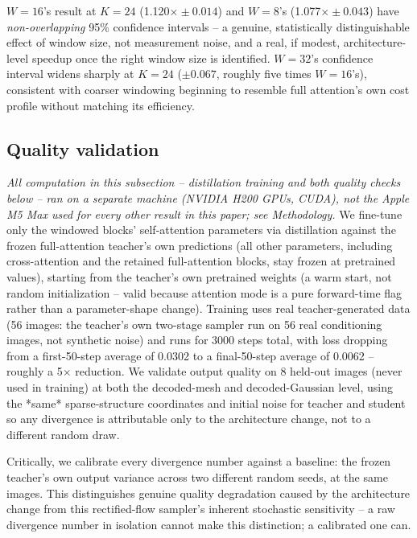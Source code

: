 \documentclass[11pt]{article}
\begin{document}
$W=16$'s result at $K=24$ (1.120$\times \pm 0.014$) and $W=8$'s (1.077$\times \pm 0.043$) have
\emph{non-overlapping} 95\% confidence intervals -- a genuine, statistically distinguishable
effect of window size, not measurement noise, and a real, if modest, architecture-level speedup
once the right window size is identified. $W=32$'s confidence interval widens sharply at $K=24$
($\pm 0.067$, roughly five times $W=16$'s), consistent with coarser windowing beginning to
resemble full attention's own cost profile without matching its efficiency.

\subsection{Quality validation}
\label{sec:quality-validation}
\emph{All computation in this subsection -- distillation training and both quality checks below --
ran on a separate machine (NVIDIA H200 GPUs, CUDA), not the Apple M5 Max used for every other
result in this paper; see Methodology.} We fine-tune only the windowed blocks' self-attention parameters via distillation against the
frozen full-attention teacher's own predictions (all other parameters, including cross-attention
and the retained full-attention blocks, stay frozen at pretrained values), starting from the
teacher's own pretrained weights (a warm start, not random initialization -- valid because
attention mode is a pure forward-time flag rather than a parameter-shape change). Training uses
real teacher-generated data (56 images: the teacher's own two-stage sampler run on 56 real
conditioning images, not synthetic noise) and runs for 3000 steps total, with loss dropping from a
first-50-step average of 0.0302 to a final-50-step average of 0.0062 -- roughly a 5$\times$
reduction. We validate output quality on 8 held-out images (never used in training) at both the
decoded-mesh and decoded-Gaussian level, using the *same* sparse-structure coordinates and initial
noise for teacher and student so any divergence is attributable only to the architecture change,
not to a different random draw.

Critically, we calibrate every divergence number against a baseline: the frozen teacher's own
output variance across two different random seeds, at the same images. This distinguishes genuine
quality degradation caused by the architecture change from this rectified-flow sampler's inherent
stochastic sensitivity -- a raw divergence number in isolation cannot make this distinction; a
calibrated one can.
\end{document}
